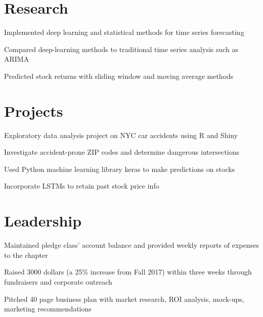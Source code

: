\documentclass[]{deedy-resume-openfont}
\begin{document}
\begin{minipage}[t]{0.66\textwidth}
\section{Research}
\begin{tightemize} 
\item Implemented deep learning and statistical methods for time series forecasting
\item Compared deep-learning methods to traditional time series analysis such as ARIMA
\item Predicted stock returns with sliding window and moving average methods
\end{tightemize}
\sectionsep


\section{Projects}
\location{}
\begin{tightemize} 
\item Exploratory data analysis project on NYC car accidents using R and Shiny
\item Investigate accident-prone ZIP codes and determine dangerous intersections
\end{tightemize}
\location{}
\begin{tightemize} 
\item Used Python machine learning library keras to make predictions on stocks
\item Incorporate LSTMs to retain past stock price info
\end{tightemize}
\sectionsep


\section{Leadership}
\begin{tightemize} 
\item Maintained pledge class’ account balance and provided weekly reports of expenses to the chapter
\item Raised 3000 dollars (a 25\% increase from Fall 2017) within three weeks through fundraisers and corporate outreach
\item Pitched 40 page business plan with market research, ROI analysis, mock-ups, marketing recommendations
\end{tightemize}
\sectionsep



\end{minipage} 
\end{document}

